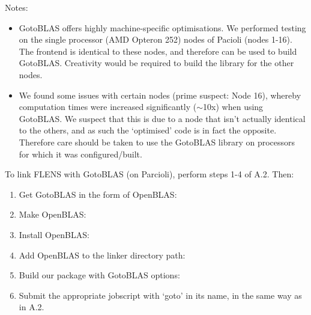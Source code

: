  Notes:
 \begin{itemize}
    \item GotoBLAS offers highly machine-specific optimisations. We performed testing on the single processor (AMD Opteron 252) nodes of Pacioli (nodes 1-16). The frontend is identical to these nodes, and therefore can be used to build GotoBLAS. Creativity would be required to build the library for the other nodes.
    \item We found some issues with certain nodes (prime suspect: Node 16), whereby computation times were increased significantly ($\sim$10x) when using GotoBLAS. We suspect that this is due to a node that isn't actually identical to the others, and as such the `optimised' code is in fact the opposite. Therefore care should be taken to use the GotoBLAS library on processors for which it was configured/built.
 \end{itemize}
 To link FLENS with GotoBLAS (on Parcioli), perform steps 1-4 of A.2. Then:
 
 \begin{enumerate}
    \item Get GotoBLAS in the form of OpenBLAS:
    \item Make OpenBLAS:
    \item Install OpenBLAS:
    \item Add OpenBLAS to the linker directory path:
    
    \item Build our package with GotoBLAS options:
    \item Submit the appropriate jobscript with `goto' in its name, in the same way as in A.2.
\end{enumerate}
    
    
    
    
    
    
    
    
    
    
    
      
      